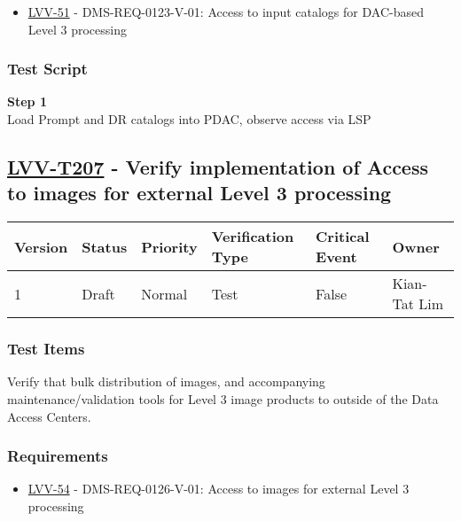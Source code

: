 \begin{itemize}
\tightlist
\item
  \href{https://jira.lsstcorp.org/browse/LVV-51}{LVV-51} -
  DMS-REQ-0123-V-01: Access to input catalogs for DAC-based Level 3
  processing
\end{itemize}

\subsubsection{Test Script}\label{test-script-63}

\textbf{Step 1}\\
Load Prompt and DR catalogs into PDAC, observe access via
LSP\\[2\baselineskip]

\hypertarget{lvv-t207---verify-implementation-of-access-to-images-for-external-level-3-processing}{\subsection{\texorpdfstring{\href{https://jira.lsstcorp.org/secure/Tests.jspa\#/testCase/LVV-T207}{LVV-T207}
- Verify implementation of Access to images for external Level 3
processing}{LVV-T207 - Verify implementation of Access to images for external Level 3 processing}}\label{lvv-t207---verify-implementation-of-access-to-images-for-external-level-3-processing}}

\begin{longtable}[]{@{}llllll@{}}
\toprule
Version & Status & Priority & Verification Type & Critical Event &
Owner\tabularnewline
\midrule
\endhead
1 & Draft & Normal & Test & False & Kian-Tat Lim\tabularnewline
\bottomrule
\end{longtable}

\subsubsection{Test Items}\label{test-items-63}

Verify that bulk distribution of images, and accompanying
maintenance/validation tools for Level 3 image products to outside of
the Data Access Centers.

\subsubsection{Requirements}\label{requirements-64}

\begin{itemize}
\tightlist
\item
  \href{https://jira.lsstcorp.org/browse/LVV-54}{LVV-54} -
  DMS-REQ-0126-V-01: Access to images for external Level 3 processing
\end{itemize}

